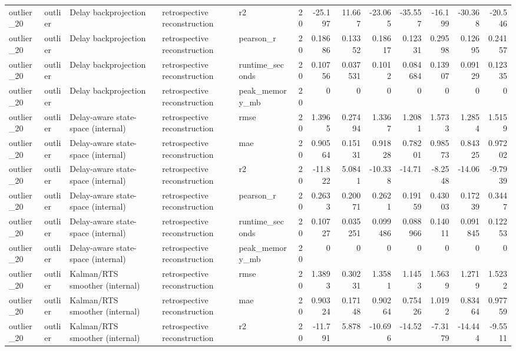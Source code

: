 \begin{table}[!htbp]
{{\begin{tabular}{lllllrrrrrrrr}
outlier_20 & outlier & Delay backprojection & retrospective reconstruction & r2 & 20 & -25.197 & 11.667 & -23.065 & -35.557 & -16.199 & -30.368 & -20.546 \\
outlier_20 & outlier & Delay backprojection & retrospective reconstruction & pearson_r & 20 & 0.18686 & 0.13352 & 0.18617 & 0.12331 & 0.29598 & 0.12695 & 0.24157 \\
outlier_20 & outlier & Delay backprojection & retrospective reconstruction & runtime_seconds & 20 & 0.10756 & 0.037531 & 0.1012 & 0.084684 & 0.13907 & 0.09129 & 0.12335 \\
outlier_20 & outlier & Delay backprojection & retrospective reconstruction & peak_memory_mb & 20 & 0 & 0 & 0 & 0 & 0 & 0 & 0 \\
outlier_20 & outlier & Delay-aware state-space (internal) & retrospective reconstruction & rmse & 20 & 1.3965 & 0.27494 & 1.3367 & 1.2081 & 1.5733 & 1.2854 & 1.5159 \\
outlier_20 & outlier & Delay-aware state-space (internal) & retrospective reconstruction & mae & 20 & 0.90564 & 0.15131 & 0.91828 & 0.78201 & 0.98573 & 0.84325 & 0.97202 \\
outlier_20 & outlier & Delay-aware state-space (internal) & retrospective reconstruction & r2 & 20 & -11.822 & 5.0841 & -10.338 & -14.71 & -8.2548 & -14.06 & -9.7939 \\
outlier_20 & outlier & Delay-aware state-space (internal) & retrospective reconstruction & pearson_r & 20 & 0.2633 & 0.20071 & 0.2621 & 0.19159 & 0.43003 & 0.17239 & 0.3447 \\
outlier_20 & outlier & Delay-aware state-space (internal) & retrospective reconstruction & runtime_seconds & 20 & 0.10727 & 0.035251 & 0.099486 & 0.088966 & 0.14011 & 0.091845 & 0.12253 \\
outlier_20 & outlier & Delay-aware state-space (internal) & retrospective reconstruction & peak_memory_mb & 20 & 0 & 0 & 0 & 0 & 0 & 0 & 0 \\
outlier_20 & outlier & Kalman/RTS smoother (internal) & retrospective reconstruction & rmse & 20 & 1.3893 & 0.30231 & 1.3581 & 1.1453 & 1.5639 & 1.2719 & 1.5232 \\
outlier_20 & outlier & Kalman/RTS smoother (internal) & retrospective reconstruction & mae & 20 & 0.90324 & 0.17148 & 0.90264 & 0.75426 & 1.0192 & 0.83464 & 0.97759 \\
outlier_20 & outlier & Kalman/RTS smoother (internal) & retrospective reconstruction & r2 & 20 & -11.791 & 5.878 & -10.696 & -14.52 & -7.3179 & -14.444 & -9.5511 \\

\end{tabular}}}
\end{table}
